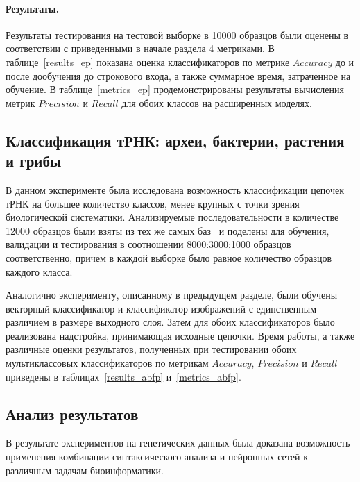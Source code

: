 \paragraph{Результаты.} Результаты тестирования на тестовой выборке в 10000 образцов были оценены в соответствии с приведенными в начале раздела 4 метриками. В таблице~\ref{results_ep} показана оценка классификаторов по метрике $Accuracy$ до и после дообучения до строкового входа, а также суммарное время, затраченное на обучение. В таблице~\ref{metrics_ep} продемонстрированы результаты вычисления метрик $Precision$ и $Recall$ для обоих классов на расширенных моделях.





\subsection{Классификация тРНК: археи, бактерии, растения и грибы}
В данном эксперименте была исследована возможность классификации цепочек тРНК на большее количество классов, менее крупных с точки зрения биологической систематики. Анализируемые последовательности в количестве 12000 образцов были взяты из тех же самых  баз~\cite{trnadb1,trnadb2} и поделены для обучения, валидации и тестирования в соотношении 8000:3000:1000 образцов соответственно, причем в каждой выборке было равное количество образцов каждого класса.

Аналогично эксперименту, описанному в предыдущем разделе, были обучены векторный классификатор и классификатор изображений с единственным различием в размере выходного слоя. Затем для обоих классификаторов было реализована надстройка, принимающая исходные цепочки. Время работы, а также различные оценки результатов, полученных при тестировании обоих мультиклассовых классификаторов по метрикам $Accuracy$, $Precision$ и $Recall$ приведены в таблицах~\ref{results_abfp} и~\ref{metrics_abfp}.




\subsection{Анализ результатов}
В результате экспериментов на генетических данных была доказана возможность применения комбинации синтаксического анализа и нейронных сетей к различным задачам биоинформатики.

